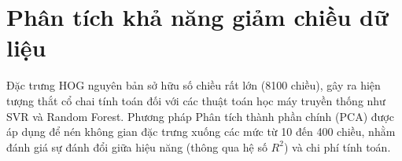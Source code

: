 


\section{Phân tích khả năng giảm chiều dữ liệu}
\label{sec:pca_analysis}
Đặc trưng HOG nguyên bản sở hữu số chiều rất lớn (8100 chiều), gây ra hiện tượng thắt cổ chai tính toán đối với các thuật toán học máy truyền thống như SVR và Random Forest. Phương pháp Phân tích thành phần chính (PCA) được áp dụng để nén không gian đặc trưng xuống các mức từ 10 đến 400 chiều, nhằm đánh giá sự đánh đổi giữa hiệu năng (thông qua hệ số $R^2$) và chi phí tính toán.

